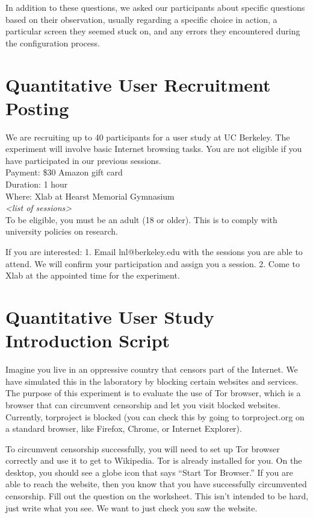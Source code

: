 \documentclass[USenglish,oneside,twocolumn]{article}
\begin{document}
In addition to these questions, we asked our participants about specific questions based on their observation, usually regarding a specific choice in action, a particular screen they seemed stuck on, and any errors they encountered during the configuration process. 

\section{Quantitative User Recruitment Posting}
\label{quantitative-recruitment}
We are recruiting up to 40 participants for a user study at UC Berkeley. The experiment will involve basic Internet browsing tasks. You are not eligible if you have participated in our previous sessions.\\

\indent Payment: \$30 Amazon gift card\\
\indent Duration: 1 hour \\
\indent Where: Xlab at Hearst Memorial Gymnasium\\

\textit{<list of sessions>}\\

To be eligible, you must be an adult (18 or older). This is to comply with university policies on research. 

If you are interested: 1. Email lnl@berkeley.edu with the sessions you are able to attend. We will confirm your participation and assign you a session. 2. Come to Xlab at the appointed time for the experiment.

\section{Quantitative User Study Introduction Script} 
\label{quantitative-script} 
Imagine you live in an oppressive country that censors part of the Internet. We have simulated this in the laboratory by blocking certain websites and services.  The purpose of this experiment is to evaluate the use of Tor browser, which is a browser that can circumvent censorship and let you visit blocked websites. Currently, torproject is blocked (you can check this by going to torproject.org on a standard browser, like Firefox, Chrome, or Internet Explorer). 

To circumvent censorship successfully, you will need to set up Tor browser correctly and use it to get to Wikipedia. Tor is already installed for you. On the desktop, you should see a globe icon that says ``Start Tor Browser.'' If you are able to reach the website, then you know that you have successfully circumvented censorship. Fill out the question on the worksheet. This isn't intended to be hard, just write what you see. We want to just check you saw the website. 
\end{document}
